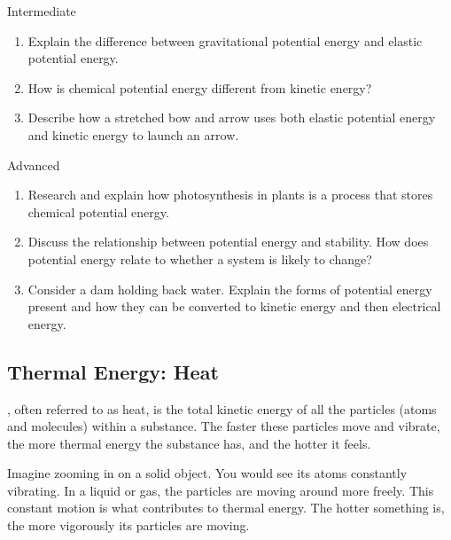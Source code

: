 \begin{tieredquestions}{Intermediate}
\begin{enumerate}
    \item Explain the difference between gravitational potential energy and elastic potential energy.
    \item How is chemical potential energy different from kinetic energy?
    \item Describe how a stretched bow and arrow uses both elastic potential energy and kinetic energy to launch an arrow.
\end{enumerate}
\end{tieredquestions}

\begin{tieredquestions}{Advanced}
\begin{enumerate}
    \item Research and explain how photosynthesis in plants is a process that stores chemical potential energy.
    \item Discuss the relationship between potential energy and stability.  How does potential energy relate to whether a system is likely to change?
    \item Consider a dam holding back water. Explain the forms of potential energy present and how they can be converted to kinetic energy and then electrical energy.
\end{enumerate}
\end{tieredquestions}


\subsection{Thermal Energy: Heat}

, often referred to as heat, is the total kinetic energy of all the particles (atoms and molecules) within a substance. The faster these particles move and vibrate, the more thermal energy the substance has, and the hotter it feels.


Imagine zooming in on a solid object. You would see its atoms constantly vibrating. In a liquid or gas, the particles are moving around more freely. This constant motion is what contributes to thermal energy.  The hotter something is, the more vigorously its particles are moving.

